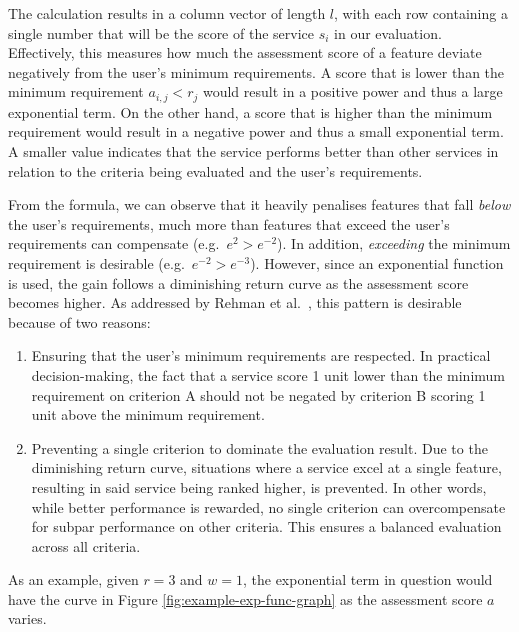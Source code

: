 The calculation results in a column vector of length \(l\), with each
row containing a single number that will be the score of the service
\(s_i\) in our evaluation. Effectively, this measures how much the
assessment score of a feature deviate negatively from the user's minimum
requirements. A score that is lower than the minimum requirement
\(a_{i,j}<r_j\) would result in a positive power and thus a large
exponential term. On the other hand, a score that is higher than the
minimum requirement would result in a negative power and thus a small
exponential term. A smaller value indicates that the service performs
better than other services in relation to the criteria being evaluated
and the user's requirements.

From the formula, we can observe that it heavily penalises features that
fall \emph{below} the user's requirements, much more than features that
exceed the user's requirements can compensate (e.g.~\(e^{2} > e^{-2}\)).
In addition, \emph{exceeding} the minimum requirement is desirable
(e.g.~\(e^{-2}>e^{-3}\)). However, since an exponential function is
used, the gain follows a diminishing return curve as the assessment
score becomes higher. As addressed by Rehman et al.~\cite{5976164}, this
pattern is desirable because of two reasons:

\begin{enumerate}
\def\labelenumi{\arabic{enumi}.}
\tightlist
\item
  Ensuring that the user's minimum requirements are respected. In
  practical decision-making, the fact that a service score 1 unit lower
  than the minimum requirement on criterion A should not be negated by
  criterion B scoring 1 unit above the minimum requirement.
\item
  Preventing a single criterion to dominate the evaluation result. Due
  to the diminishing return curve, situations where a service excel at a
  single feature, resulting in said service being ranked higher, is
  prevented. In other words, while better performance is rewarded, no
  single criterion can overcompensate for subpar performance on other
  criteria. This ensures a balanced evaluation across all criteria.
\end{enumerate}

As an example, given \(r=3\) and \(w=1\), the exponential term in
question would have the curve in Figure \ref{fig:example-exp-func-graph} as the assessment score \(a\)
varies.

